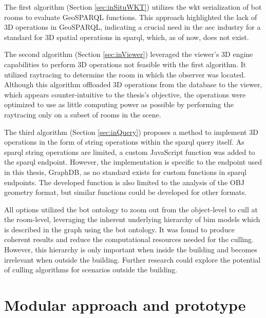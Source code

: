 The first algorithm (Section \ref{sec:inSituWKT}) utilizes the \ac{wkt} serialization of \ac{bot} rooms to evaluate GeoSPARQL functions. This approach highlighted the lack of 3D operations in GeoSPARQL, indicating a crucial need in the \ac{aec} industry for a standard for 3D spatial operations in \ac{sparql}, which, as of now, does not exist.

The second algorithm (Section \ref{sec:inViewer}) leveraged the viewer's 3D engine capabilities to perform 3D operations not feasible with the first algorithm. It utilized raytracing to determine the room in which the observer was located. Although this algorithm offloaded 3D operations from the database to the viewer, which appears counter-intuitive to the thesis's objective, the operations were optimized to use as little computing power as possible by performing the raytracing only on a subset of rooms in the scene.

The third algorithm (Section \ref{sec:inQuery}) proposes a method to implement 3D operations in the form of string operations within the \ac{sparql} query itself. As \ac{sparql} string operations are limited, a custom JavaScript function was added to the \ac{sparql} endpoint. However, the implementation is specific to the endpoint used in this thesis, GraphDB, as no standard exists for custom functions in \ac{sparql} endpoints. The developed function is also limited to the analysis of the OBJ geometry format, but similar functions could be developed for other formats.

All options utilized the \ac{bot} ontology to zoom out from the object-level to cull at the room-level, leveraging the inherent underlying hierarchy of \ac{bim} models which is described in the graph using the \ac{bot} ontology. It was found to produce coherent results and reduce the computational resources needed for the culling. However, this hierarchy is only important when inside the building and becomes irrelevant when outside the building. Further research could explore the potential of culling algorithms for scenarios outside the building.

\section{Modular approach and prototype}


